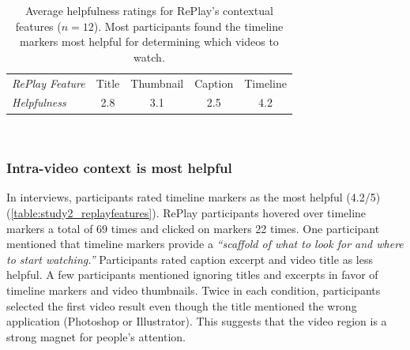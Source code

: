 \begin{table}[t]
\begin{tabular}{lllll}
\textit{RePlay Feature} & Title                   & Thumbnail               & Caption                 & Timeline                \\ 
\textit{Helpfulness}    & \multicolumn{1}{c}{2.8} & \multicolumn{1}{c}{3.1} & \multicolumn{1}{c}{2.5} & \multicolumn{1}{c}{4.2}
\end{tabular}
\caption{Average helpfulness ratings for RePlay's contextual features ($n\!=\!12$). Most participants found the timeline markers most helpful for determining which videos to watch.}~\label{table:study2_replayfeatures}
\vspace{-0.3in}
\end{table}

\subsubsection{Intra-video context is most helpful}
In interviews, participants rated timeline markers as the most helpful (4.2/5) (\autoref{table:study2_replayfeatures}). RePlay participants hovered over timeline markers a total of 69 times and clicked on markers 22 times. One participant mentioned that timeline markers provide a \textit{``scaffold of what to look for and where to start watching.''} Participants rated caption excerpt and video title as less helpful. A few participants mentioned ignoring titles and excerpts in favor of timeline markers and video thumbnails. Twice in each condition, participants selected the first video result even though the title mentioned the wrong application (Photoshop or Illustrator). This suggests that the video region is a strong magnet for people's attention.




